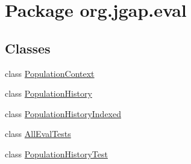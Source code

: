 \hypertarget{namespaceorg_1_1jgap_1_1eval}{\section{Package org.\-jgap.\-eval}
\label{namespaceorg_1_1jgap_1_1eval}
}
\subsection*{Classes}
\begin{DoxyCompactItemize}
\item 
class \hyperlink{classorg_1_1jgap_1_1eval_1_1_population_context}{Population\-Context}
\item 
class \hyperlink{classorg_1_1jgap_1_1eval_1_1_population_history}{Population\-History}
\item 
class \hyperlink{classorg_1_1jgap_1_1eval_1_1_population_history_indexed}{Population\-History\-Indexed}
\item 
class \hyperlink{classorg_1_1jgap_1_1eval_1_1_all_eval_tests}{All\-Eval\-Tests}
\item 
class \hyperlink{classorg_1_1jgap_1_1eval_1_1_population_history_test}{Population\-History\-Test}
\end{DoxyCompactItemize}
